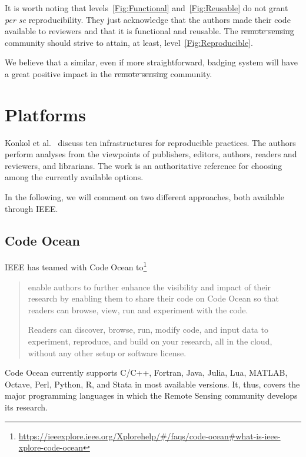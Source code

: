 \documentclass[journal,twoside]{IEEEtran}
\providecommand{\DIFadd}[1]{{\protect\color{blue}\uwave{#1}}} %
\providecommand{\DIFdel}[1]{{\protect\color{red}\sout{#1}}}                      %
\providecommand{\DIFaddbegin}{} %
\providecommand{\DIFaddend}{} %
\providecommand{\DIFdelbegin}{} %
\providecommand{\DIFdelend}{} %
\newcommand{\DIFscaledelfig}{0.5}
\newlength{\DIFdelgraphicswidth} %
\newlength{\DIFdelgraphicsheight} %
\newcommand{\DIFaddincludegraphics}[2][]{{\color{blue}\fbox{\DIFOincludegraphics[#1]{#2}}}} %
\newcommand{\DIFdelincludegraphics}[2][]{%
\sbox{\DIFdelgraphicsbox}{\DIFOincludegraphics[#1]{#2}}%
\settoboxwidth{\DIFdelgraphicswidth}{\DIFdelgraphicsbox} %
\settoboxtotalheight{\DIFdelgraphicsheight}{\DIFdelgraphicsbox} %
\scalebox{\DIFscaledelfig}{%
\parbox[b]{\DIFdelgraphicswidth}{\usebox{\DIFdelgraphicsbox}\\[-\baselineskip] \rule{\DIFdelgraphicswidth}{0em}}\llap{\resizebox{\DIFdelgraphicswidth}{\DIFdelgraphicsheight}{%
\setlength{\unitlength}{\DIFdelgraphicswidth}%
\begin{picture}(1,1)%
\thicklines\linethickness{2pt} %
{\color[rgb]{1,0,0}\put(0,0){\framebox(1,1){}}}%
{\color[rgb]{1,0,0}\put(0,0){\line( 1,1){1}}}%
{\color[rgb]{1,0,0}\put(0,1){\line(1,-1){1}}}%
\end{picture}%
}\hspace*{3pt}}} %
} %
\DeclareRobustCommand{\DIFaddbegin}{\DIFOaddbegin \let\includegraphics\DIFaddincludegraphics} %
\DeclareRobustCommand{\DIFaddend}{\DIFOaddend \let\includegraphics\DIFOincludegraphics} %
\DeclareRobustCommand{\DIFdelbegin}{\DIFOdelbegin \let\includegraphics\DIFdelincludegraphics} %
\DeclareRobustCommand{\DIFdelend}{\DIFOaddend \let\includegraphics\DIFOincludegraphics} %
\begin{document}
It is worth noting that levels~\ref{Fig:Functional} and~\ref{Fig:Reusable} do not grant \textit{per se} reproducibility.
They just acknowledge that the authors made their code available to reviewers and that it is functional and reusable.
The \DIFdelbegin \DIFdel{remote sensing }\DIFdelend \DIFaddbegin \DIFadd{Remote Sensing }\DIFaddend community should strive to attain, at least, level~\ref{Fig:Reproducible}.

We believe that a similar, even if more straightforward, badging system will have a great positive impact in the \DIFdelbegin \DIFdel{remote sensing }\DIFdelend \DIFaddbegin \DIFadd{Remote Sensing }\DIFaddend community.

\section{Platforms}\label{Sec:IEEEPlatforms}

Konkol et al.~\cite{PublishingComputationalResearchaReviewofInfrastructuresforReproducibleandTransparentScholarlyCommunication} discuss ten infrastructures for reproducible practices.
The authors perform analyses from the viewpoints of publishers, editors, authors, readers and reviewers, and librarians.
The work is an authoritative reference for choosing among the currently available options.

In the following, we will comment on two different approaches, both available through IEEE.

\subsection{Code Ocean}

IEEE has teamed with Code Ocean to\footnote{\url{https://ieeexplore.ieee.org/Xplorehelp/#/faqs/code-ocean#what-is-ieee-xplore-code-ocean}}
\begin{quote}
	enable authors to further enhance the visibility and impact of their research by enabling them to share their code on Code Ocean so that readers can browse, view, run and experiment with the code.

	Readers can discover, browse, run, modify code, and input data to experiment, reproduce, and build on your research, all in the cloud, without any other setup or software license.
\end{quote}

Code Ocean currently supports 
C/C++, 
Fortran,
Java,
Julia,
Lua,
MATLAB,
Octave,
Perl,
Python,
R, and
Stata in most available versions.
It, thus, covers the major programming languages in which the Remote Sensing community develops its research.
\end{document}
